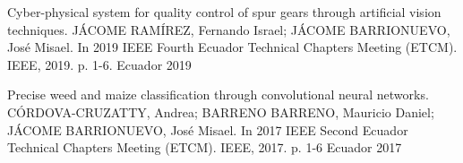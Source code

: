 

\begin{cvhonors}

  \cvhonor
    {Cyber-physical system for quality control of spur gears through artificial vision techniques.} %
    {JÁCOME RAMÍREZ, Fernando Israel; JÁCOME BARRIONUEVO, José Misael. In 2019 IEEE Fourth Ecuador Technical Chapters Meeting (ETCM). IEEE, 2019. p. 1-6.} %
    {Ecuador} %
    {2019} %

  \cvhonor
    {Precise weed and maize classification through convolutional neural networks.} %
    {CÓRDOVA-CRUZATTY, Andrea; BARRENO BARRENO, Mauricio Daniel; JÁCOME BARRIONUEVO, José Misael.  In 2017 IEEE Second Ecuador Technical Chapters Meeting (ETCM). IEEE, 2017. p. 1-6} %
    {Ecuador} %
    {2017} %


\end{cvhonors}
